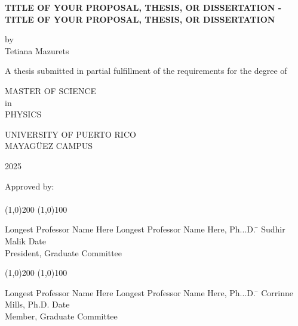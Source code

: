 



\thispagestyle{empty}
\begin{center}
	\begin{singlespace}
		\textbf{TITLE OF YOUR PROPOSAL, THESIS, OR DISSERTATION - TITLE OF YOUR PROPOSAL, THESIS, OR DISSERTATION}
	\end{singlespace}
	\vspace{4 mm}
	by
	\\
	\vspace{4 mm}
	Tetiana Mazurets %
	\vspace{4 mm}
	\begin{singlespace}
		A thesis submitted in partial fulfillment of the requirements for the degree of %
	\end{singlespace}
	\vspace{4 mm}
	MASTER OF SCIENCE %
	\\
	in
	\\
	PHYSICS %
	\\
	\vspace{4 mm}
	\begin{singlespace}

		UNIVERSITY OF PUERTO RICO
		\\
		MAYAG\"UEZ CAMPUS
	\end{singlespace}

	2025 %
\end{center}
\bigskip
\bigskip
\bigskip
\bigskip
\bigskip
\bigskip
\bigskip

\noindent Approved by:
\\
\\

\noindent
\line(1,0){200} \hspace{40 mm} \line(1,0){100}\\
\noindent
\vspace{-1.75\baselineskip}
\begin{tabbing}
	Longest Professor Name Here Longest Professor Name Here, Ph...D. \=  \kill
	Sudhir Malik \>  Date\\President, Graduate Committee  %
\end{tabbing}



\noindent
\line(1,0){200} \hspace{40 mm} \line(1,0){100}\\
\noindent
\vspace{-1.75\baselineskip}
\begin{tabbing}
	Longest Professor Name Here Longest Professor Name Here, Ph...D. \=  \kill
	Corrinne Mills, Ph.D. \>  Date\\Member, Graduate Committee  %
\end{tabbing}

